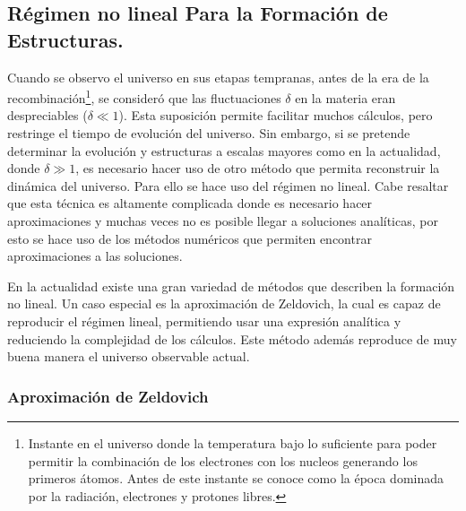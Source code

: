 \subsection{Régimen no lineal Para la Formación de Estructuras.}
\label{subsec:non-Lineal_Estructure_Formation}

Cuando se observo el universo en sus etapas tempranas, antes de la era de la recombinación\footnote{Instante en el universo donde la temperatura bajo lo suficiente para poder permitir la combinación de los electrones con los nucleos generando los primeros átomos. Antes de este instante se conoce como la época dominada por la radiación, electrones y protones libres.}, se consideró que las fluctuaciones $\delta$  en la materia eran despreciables ($\delta \ll 1$). Esta suposición permite facilitar muchos cálculos, pero restringe el tiempo de evolución del universo. Sin embargo, si se pretende determinar la evolución y estructuras a escalas mayores como en la actualidad, donde $\delta \gg 1$, es necesario hacer uso de otro método que permita reconstruir la dinámica del universo. Para ello se hace uso del régimen no lineal. Cabe resaltar que esta técnica es altamente complicada donde es necesario hacer aproximaciones y muchas veces no es posible llegar a soluciones analíticas, por esto se hace uso de los métodos numéricos que permiten encontrar aproximaciones a las soluciones. 

En la actualidad existe una gran variedad de métodos que describen la formación no lineal. Un caso especial es la aproximación de Zeldovich, la cual es capaz de reproducir el régimen lineal, permitiendo usar una  expresión analítica y reduciendo la complejidad de los cálculos. Este método además reproduce de muy buena manera el universo observable actual.




	\subsubsection{Aproximación de Zeldovich}
	\label{subsubsec:Zeldovich_Aproximation}


